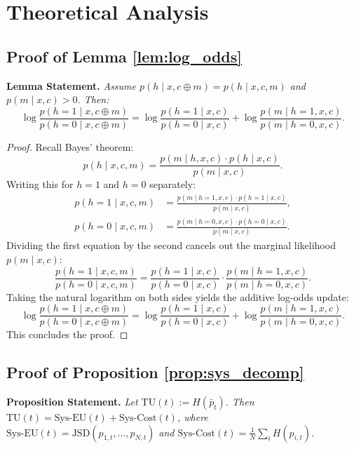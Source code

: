 \documentclass{article}
\theoremstyle{plain}
\theoremstyle{definition}
\theoremstyle{remark}
\begin{document}
\section{Theoretical Analysis}


\subsection{Proof of Lemma \ref{lem:log_odds}}\label{app:proof_lemma1}
\textbf{Lemma Statement.}
\textit{
Assume $p(h \mid x, c \oplus m) = p(h \mid x, c, m)$ and $p(m \mid x, c) > 0$. Then:
\[
\log \frac{p(h=1 \mid x, c \oplus m)}{p(h=0 \mid x, c \oplus m)}
=
\log \frac{p(h=1 \mid x, c)}{p(h=0 \mid x, c)}
+
\log \frac{p(m \mid h=1, x, c)}{p(m \mid h=0, x, c)}.
\]
}

\begin{proof}
Recall Bayes' theorem:
\begin{equation}
    p(h \mid x, c, m) = \frac{p(m \mid h, x, c) \cdot p(h \mid x, c)}{p(m \mid x, c)}.
\end{equation}
Writing this for $h=1$ and $h=0$ separately:
\begin{align}
    p(h=1 \mid x, c, m) &= \frac{p(m \mid h=1, x, c) \cdot p(h=1 \mid x, c)}{p(m \mid x, c)}, \\
    p(h=0 \mid x, c, m) &= \frac{p(m \mid h=0, x, c) \cdot p(h=0 \mid x, c)}{p(m \mid x, c)}.
\end{align}
Dividing the first equation by the second cancels out the marginal likelihood $p(m \mid x, c)$:
\begin{equation}
    \frac{p(h=1 \mid x, c, m)}{p(h=0 \mid x, c, m)} = \frac{p(h=1 \mid x, c)}{p(h=0 \mid x, c)} \cdot \frac{p(m \mid h=1, x, c)}{p(m \mid h=0, x, c)}.
\end{equation}
Taking the natural logarithm on both sides yields the additive log-odds update:
\begin{equation}
    \log \frac{p(h=1 \mid x, c \oplus m)}{p(h=0 \mid x, c \oplus m)}
    =
    \log \frac{p(h=1 \mid x, c)}{p(h=0 \mid x, c)}
    +
    \log \frac{p(m \mid h=1, x, c)}{p(m \mid h=0, x, c)}.
\end{equation}
This concludes the proof.
\end{proof}

\subsection{Proof of Proposition \ref{prop:sys_decomp}}\label{app:proof_prop2}
\textbf{Proposition Statement.}
\textit{
Let $\mathrm{TU}(t) := H(\bar{p}_t)$. Then $\mathrm{TU}(t) = \mathrm{Sys\mbox{-}EU}(t) + \mathrm{Sys\mbox{-}Cost}(t)$, where $\mathrm{Sys\mbox{-}EU}(t) = \mathrm{JSD}(p_{1,t}, \dots, p_{N,t})$ and $\mathrm{Sys\mbox{-}Cost}(t) = \frac{1}{N}\sum_i H(p_{i,t})$.
}
\end{document}
